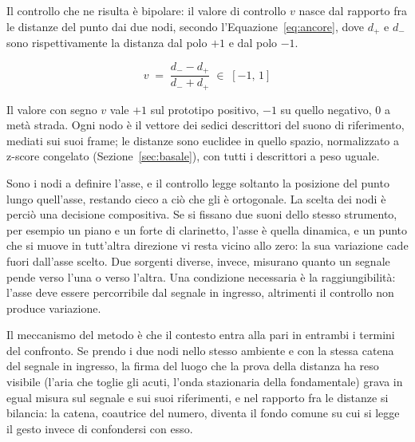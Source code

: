 \documentclass{article}
\begin{document}
Il controllo che ne risulta è bipolare: il valore di controllo $v$ nasce dal rapporto fra le distanze del punto dai due nodi, secondo l'Equazione~\eqref{eq:ancore}, dove $d_{+}$ e $d_{-}$ sono rispettivamente la distanza dal polo $+1$ e dal polo $-1$.

\begin{equation}
  v \;=\; \frac{d_{-} - d_{+}}{d_{-} + d_{+}} \;\in\; [-1,\,1]
  \label{eq:ancore}
\end{equation}

Il valore con segno $v$ vale $+1$ sul prototipo positivo, $-1$ su quello negativo, $0$ a metà strada. Ogni nodo è il vettore dei sedici descrittori del suono di riferimento, mediati sui suoi frame; le distanze sono euclidee in quello spazio, normalizzato a z-score congelato (Sezione~\ref{sec:basale}), con tutti i descrittori a peso uguale.



Sono i nodi a definire l'asse, e il controllo legge soltanto la posizione del punto lungo quell'asse, restando cieco a ciò che gli è ortogonale. La scelta dei nodi è perciò una decisione compositiva. Se si fissano due suoni dello stesso strumento, per esempio un piano e un forte di clarinetto, l'asse è quella dinamica, e un punto che si muove in tutt'altra direzione vi resta vicino allo zero: la sua variazione cade fuori dall'asse scelto. Due sorgenti diverse, invece, misurano quanto un segnale pende verso l'una o verso l'altra. Una condizione necessaria è la raggiungibilità: l'asse deve essere percorribile dal segnale in ingresso, altrimenti il controllo non produce variazione. %

Il meccanismo del metodo è che il contesto entra alla pari in entrambi i termini del confronto. Se prendo i due nodi nello stesso ambiente e con la stessa catena del segnale in ingresso, la firma del luogo che la prova della distanza ha reso visibile (l'aria che toglie gli acuti, l'onda stazionaria della fondamentale) grava in egual misura sul segnale e sui suoi riferimenti, e nel rapporto fra le distanze si bilancia: la catena, coautrice del numero, diventa il fondo comune su cui si legge il gesto invece di confondersi con esso.
\end{document}
